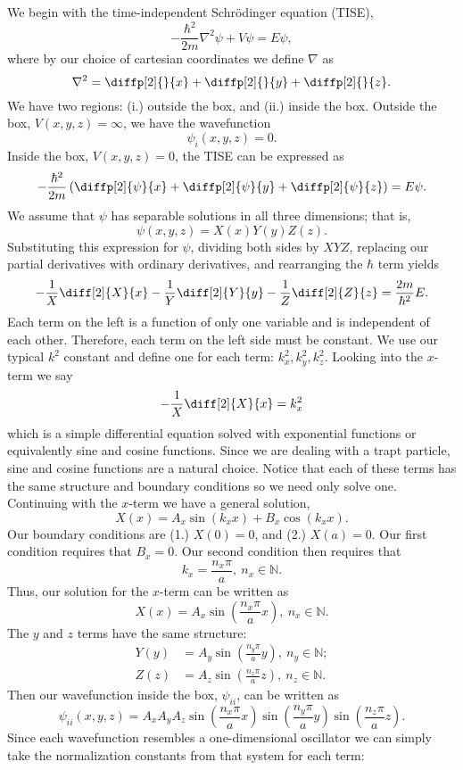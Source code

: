 \documentclass[a4paper, 12pt]{config/homework}
\begin{document}
\begin{enumerate}
\begin{enumerate}[label=(\alph*.)]
We begin with the time-independent Schr{\"o}dinger equation (TISE),
\[-\frac{\hbar^2}{2m}\nabla^2\psi + V\psi = E\psi,\]
where by our choice of cartesian coordinates we define \(\nabla\) as
\[\nabla^2 = \diffp[2]{}{x} + \diffp[2]{}{y} + \diffp[2]{}{z}.\]
We have two regions: (i.) outside the box, and (ii.) inside the box. Outside the box, \(V(x,y,z)=\infty\), we have the wavefunction
\[\psi_i(x,y,z)=0.\]
Inside the box, \(V(x,y,z)=0\), the TISE can be expressed as
\[-\frac{\hbar^2}{2m}\left( \diffp[2]{\psi}{x} + \diffp[2]{\psi}{y} + \diffp[2]{\psi}{z} \right) = E\psi.\]
We assume that \(\psi\) has separable solutions in all three dimensions; that is,
\[\psi(x,y,z) = X(x)Y(y)Z(z).\]
Substituting this expression for \(\psi\), dividing both sides by \(XYZ\), replacing our partial derivatives with ordinary derivatives, and rearranging the \(\hbar\) term yields
\[-\frac{1}{X}\diff[2]{X}{x} - \frac{1}{Y}\diff[2]{Y}{y} - \frac{1}{Z}\diff[2]{Z}{z} = \frac{2m}{\hbar^2}E.\]
Each term on the left is a function of only one variable and is independent of each other. Therefore, each term on the left side must be constant. We use our typical \(k^2\) constant and define one for each term: \(k^2_x, k^2_y, k^2_z\). Looking into the \(x\)-term we say
\[-\frac{1}{X}\diff[2]{X}{x} = k^2_x\]
which is a simple differential equation solved with exponential functions or equivalently sine and cosine functions. Since we are dealing with a trapt particle, sine and cosine functions are a natural choice. Notice that each of these terms has the same structure and boundary conditions so we need only solve one. Continuing with the \(x\)-term we have a general solution,
\[X(x) = A_x\sin(k_x x) + B_x\cos(k_x x).\]
Our boundary conditions are (1.) \(X(0)=0\), and (2.) \(X(a)=0\). Our first condition requires that \(B_x=0\). Our second condition then requires that
\[k_x = \frac{n_x\pi}{a},\ n_x\in\mathbb{N}.\]
Thus, our solution for the \(x\)-term can be written as
\[X(x) = A_x\sin\left(\frac{n_x\pi}{a}x\right),\ n_x\in\mathbb{N}.\]
The \(y\) and \(z\) terms have the same structure:
\begin{align*}
Y(y) &= A_y\sin\left(\frac{n_y\pi}{a}y\right),\ n_y\in\mathbb{N}; \\
Z(z) &= A_z\sin\left(\frac{n_z\pi}{a}z\right),\ n_z\in\mathbb{N}.
\end{align*}
Then our wavefunction inside the box, \(\psi_{ii}\), can be written as
\[\psi_{ii}(x,y,z) = A_x A_y A_z\sin\left(\frac{n_x\pi}{a}x\right)\sin\left(\frac{n_y\pi}{a}y\right)\sin\left(\frac{n_z\pi}{a}z\right).\]
Since each wavefunction resembles a one-dimensional oscillator we can simply take the normalization constants from that system for each term:

\end{enumerate}
\end{enumerate}
\end{document}
